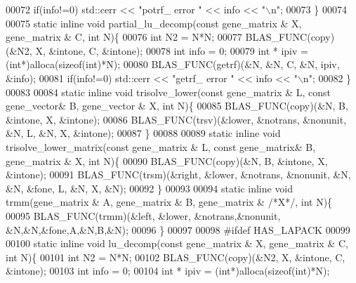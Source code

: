 \begin{DoxyCode}
00072     \textcolor{keywordflow}{if}(info!=0) std::cerr << \textcolor{stringliteral}{"potrf\_ error "} << info << \textcolor{stringliteral}{"\(\backslash\)n"};
00073   \}
00074 
00075   \textcolor{keyword}{static} \textcolor{keyword}{inline} \textcolor{keywordtype}{void} partial\_lu\_decomp(\textcolor{keyword}{const} gene\_matrix & X, gene\_matrix & C, \textcolor{keywordtype}{int} N)\{
00076     \textcolor{keywordtype}{int} N2 = N*N;
00077     BLAS\_FUNC(copy)(&N2, X, &intone, C, &intone);
00078     \textcolor{keywordtype}{int} info = 0;
00079     \textcolor{keywordtype}{int} * ipiv = (\textcolor{keywordtype}{int}*)alloca(\textcolor{keyword}{sizeof}(\textcolor{keywordtype}{int})*N);
00080     BLAS\_FUNC(getrf)(&N, &N, C, &N, ipiv, &info);
00081     \textcolor{keywordflow}{if}(info!=0) std::cerr << \textcolor{stringliteral}{"getrf\_ error "} << info << \textcolor{stringliteral}{"\(\backslash\)n"};
00082   \}
00083   
00084   \textcolor{keyword}{static} \textcolor{keyword}{inline} \textcolor{keywordtype}{void} trisolve\_lower(\textcolor{keyword}{const} gene\_matrix & L, \textcolor{keyword}{const} gene\_vector& B, gene\_vector & X, \textcolor{keywordtype}{int} N)\{
00085     BLAS\_FUNC(copy)(&N, B, &intone, X, &intone);
00086     BLAS\_FUNC(trsv)(&lower, &notrans, &nonunit, &N, L, &N, X, &intone);
00087   \}
00088 
00089   \textcolor{keyword}{static} \textcolor{keyword}{inline} \textcolor{keywordtype}{void} trisolve\_lower\_matrix(\textcolor{keyword}{const} gene\_matrix & L, \textcolor{keyword}{const} gene\_matrix& B, gene\_matrix & X, \textcolor{keywordtype}{
      int} N)\{
00090     BLAS\_FUNC(copy)(&N, B, &intone, X, &intone);
00091     BLAS\_FUNC(trsm)(&right, &lower, &notrans, &nonunit, &N, &N, &fone, L, &N, X, &N);
00092   \}
00093 
00094   \textcolor{keyword}{static} \textcolor{keyword}{inline} \textcolor{keywordtype}{void} trmm(gene\_matrix & A, gene\_matrix & B, gene\_matrix & \textcolor{comment}{/*X*/}, \textcolor{keywordtype}{int} N)\{
00095     BLAS\_FUNC(trmm)(&left, &lower, &notrans,&nonunit, &N,&N,&fone,A,&N,B,&N);
00096   \}
00097 
00098 \textcolor{preprocessor}{  #ifdef HAS\_LAPACK}
00099 
00100   \textcolor{keyword}{static} \textcolor{keyword}{inline} \textcolor{keywordtype}{void} lu\_decomp(\textcolor{keyword}{const} gene\_matrix & X, gene\_matrix & C, \textcolor{keywordtype}{int} N)\{
00101     \textcolor{keywordtype}{int} N2 = N*N;
00102     BLAS\_FUNC(copy)(&N2, X, &intone, C, &intone);
00103     \textcolor{keywordtype}{int} info = 0;
00104     \textcolor{keywordtype}{int} * ipiv = (\textcolor{keywordtype}{int}*)alloca(\textcolor{keyword}{sizeof}(\textcolor{keywordtype}{int})*N);

\end{DoxyCode}
